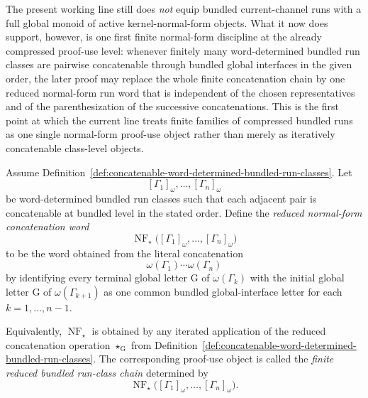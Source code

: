 \begin{remark}
\label{rem:status-of-the-first-finite-run-class-normal-form-step}
The present working line still does \emph{not} equip bundled current-channel runs with a full global monoid of active kernel-normal-form objects. What it now does support, however, is one first finite normal-form discipline at the already compressed proof-use level: whenever finitely many word-determined bundled run classes are pairwise concatenable through bundled global interfaces in the given order, the later proof may replace the whole finite concatenation chain by one reduced normal-form run word that is independent of the chosen representatives and of the parenthesization of the successive concatenations. This is the first point at which the current line treats finite families of compressed bundled runs as one single normal-form proof-use object rather than merely as iteratively concatenable class-level objects.
\end{remark}

\begin{definition}
\label{def:finite-concatenable-bundled-run-class-chain-and-reduced-normal-form-word}
Assume Definition~\ref{def:concatenable-word-determined-bundled-run-classes}. Let
\[
[\Gamma_1]_{\omega},\dots,[\Gamma_n]_{\omega}
\]
be word-determined bundled run classes such that each adjacent pair is concatenable at bundled level in the stated order. Define the \emph{reduced normal-form concatenation word}
\[
\operatorname{NF}_{\star}\bigl([\Gamma_1]_{\omega},\dots,[\Gamma_n]_{\omega}\bigr)
\]
to be the word obtained from the literal concatenation
\[
\omega(\Gamma_1)\cdots \omega(\Gamma_n)
\]
by identifying every terminal global letter $\mathrm G$ of $\omega(\Gamma_k)$ with the initial global letter $\mathrm G$ of $\omega(\Gamma_{k+1})$ as one common bundled global-interface letter for each $k=1,\dots,n-1$.

Equivalently, \(\operatorname{NF}_{\star}\) is obtained by any iterated application of the reduced concatenation operation $\star_{\mathrm G}$ from Definition~\ref{def:concatenable-word-determined-bundled-run-classes}. The corresponding proof-use object is called the \emph{finite reduced bundled run-class chain} determined by
\[
\operatorname{NF}_{\star}\bigl([\Gamma_1]_{\omega},\dots,[\Gamma_n]_{\omega}\bigr).
\]
\end{definition}

